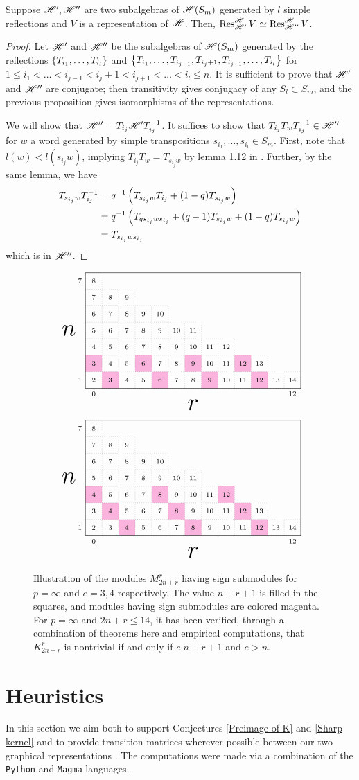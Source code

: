 \documentclass{amsart}
\begin{document}
\begin{corollary}
  Suppose $\mathscr{H}',\mathscr{H}''$ are two subalgebras of $\mathscr{H}(S_m)$ generated by $l$ simple reflections and $V$ is a representation of $\mathscr{H}$.
  Then, $\operatorname{Res}_{\mathscr{H}'}^{\mathscr{H}} V \simeq \operatorname{Res}_{\mathscr{H}''}^{\mathscr{H}} V$.
\end{corollary}
\begin{proof}
  Let $\mathscr{H}'$ and $\mathscr{H}''$ be the subalgebras of $\mathscr{H}(S_m)$ generated by the reflections $\left\{ T_{i_1},\dots,T_{i_l} \right\}$ and $\left\{ T_{i_1},\dots,T_{i_{j-1}},T_{i_j + 1},T_{i_{j+1}},\dots,T_{i_l} \right\}$ for $1 \leq i_1 < \dots < i_{j-1} < i_j + 1 < i_{j+1} < \dots < i_l \leq n$.
  It is sufficient to prove that $\mathscr{H}'$ and $\mathscr{H}''$ are conjugate;
  then transitivity gives conjugacy of any $S_l \subset S_m$, and the previous proposition gives isomorphisms of the representations.
 
  We will show that $\mathscr{H}'' = T_{i_j}\mathscr{H}'T_{i_j}^{-1}$.
  It suffices to show that $T_{i_j}T_wT_{i_j}^{-1} \in \mathscr{H}''$ for $w$ a word generated by simple transpositions $s_{i_1},\dots,s_{i_{l}} \in S_m$.
  First, note that $l(w) < l(s_{i_j}w)$, implying $T_{i_j}T_w = T_{s_{i_j}w}$ by lemma 1.12 in \cite{Mathas-book}.
  Further, by the same lemma, we have
  \begin{align*}
    T_{s_{i_j}w}T_{i_j}^{-1} 
    &= q^{-1}\left( T_{s_{i_j}w}T_{i_j} + (1-q)T_{s_{i_j}w} \right)\\
    &= q^{-1}\left( T_{qs_{i_j}ws_{i_j}} + (q-1)T_{s_{i_j}w} + (1-q)T_{s_{i_j}w} \right)\\
    &= T_{s_{i_j}ws_{i_j}}
  \end{align*}
  which is in $\mathscr{H}''$.
\end{proof}

\begin{figure}
  \[
    \ENRGrid{13/7}{2/1,5/1,8/1,11/1,1/2,4/2,7/2,10/2}
  \]\[
    \ENRGrid{13/7}{3/1,7/1,11/1,2/2,6/2,10/2,1/3,5/3,9/3}
  \]
  \caption{
    Illustration of the modules $M_{2n + r}^r$ having sign submodules for $p = \infty$ and $e = 3,4$ respectively.
    The value $n + r + 1$ is filled in the squares, and modules having sign submodules are colored magenta.
    For $p = \infty$ and $2n + r \leq 14$, it has been verified, through a combination of theorems here and empirical computations, that $K_{2n + r}^r$ is nontrivial if and only if $e | n+r+1$ and $e > n$.
  }\label{Empirical Kernel}
\end{figure}


\section{Heuristics}\label{Empirics Section}
In this section we aim both to support Conjectures \ref{Preimage of K} and \ref{Sharp kernel} and to provide transition matrices wherever possible between our two graphical representations \cite{Github}.
The computations were made via a combination of the \texttt{Python} \cite{Python} and \texttt{Magma} \cite{Magma} languages.
\end{document}
